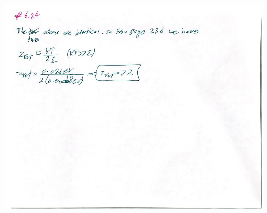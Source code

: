 \documentclass[fleqn]{article}
\begin{document}
\begin{enumerate}
      \begin{center}
        \includegraphics[height=15cm, width=16cm]{624.JPG}
      \end{center}

  \end{enumerate}
\end{document}
